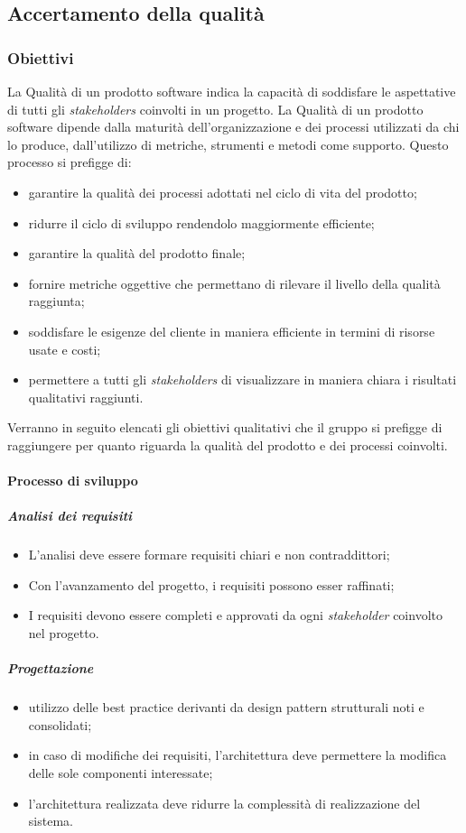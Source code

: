 \subsection{Accertamento della qualità}
\subsubsection{Obiettivi}
La Qualità di un prodotto software indica la capacità di soddisfare le aspettative di tutti gli \textit{stakeholders\glo} coinvolti in un progetto.
La Qualità di un prodotto software dipende dalla maturità dell'organizzazione e dei processi utilizzati da chi lo produce, dall'utilizzo di metriche, strumenti e metodi come supporto.
Questo processo si prefigge di:
\begin{itemize}
	\item garantire la qualità dei processi adottati nel ciclo di vita del prodotto;
	\item ridurre il ciclo di sviluppo rendendolo maggiormente efficiente;
	\item garantire la qualità del prodotto finale;
	\item fornire metriche oggettive che permettano di rilevare il livello della qualità raggiunta;
	\item soddisfare le esigenze del cliente in maniera efficiente in termini di risorse usate e costi;
	\item permettere a tutti gli \textit{stakeholders\glo} di visualizzare in maniera chiara i risultati qualitativi raggiunti.
\end{itemize}

Verranno in seguito elencati gli obiettivi qualitativi che il gruppo si prefigge di raggiungere per quanto riguarda la qualità del prodotto e dei processi coinvolti.

\paragraph{Processo di sviluppo}
\subparagraph*{Analisi dei requisiti}
\begin{itemize}
	\item L'analisi deve essere formare requisiti chiari e non contraddittori;
	\item Con l'avanzamento del progetto, i requisiti possono esser raffinati;
	\item I requisiti devono essere completi e approvati da ogni \textit{stakeholder\glos} coinvolto nel progetto.
\end{itemize}
\subparagraph*{Progettazione}
\begin{itemize}
	\item utilizzo delle best practice derivanti da design pattern strutturali noti e consolidati;
	\item in caso di modifiche dei requisiti, l'architettura deve permettere la modifica delle sole componenti interessate;
	\item l'architettura realizzata deve ridurre la complessità di realizzazione del sistema.
\end{itemize}

